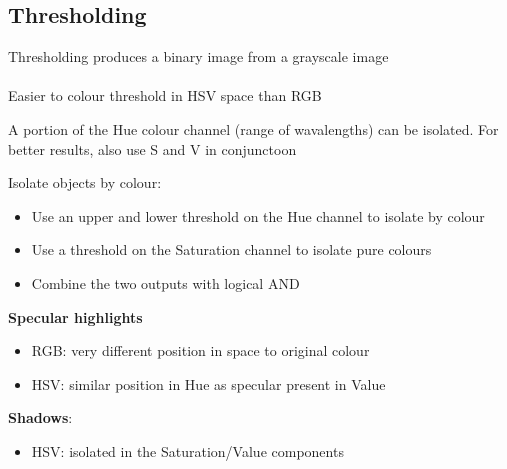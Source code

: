 \documentclass{article}[18pt]
\begin{document}
\subsection{Thresholding}
Thresholding produces a binary image from a grayscale image\\
\\
Easier to colour threshold in HSV space than RGB
\begin{definition}
	A portion of the Hue colour channel (range of wavalengths) can be isolated. For better results, also use S and V in conjunctoon
\end{definition}
Isolate objects by colour:
\begin{itemize}
	\item Use an upper and lower threshold on the Hue channel to isolate by colour
	\item Use a threshold on the Saturation channel to isolate pure colours
	\item Combine the two outputs with logical AND
\end{itemize}
\textbf{Specular highlights}
\begin{itemize}
	\item RGB: very different position in space to original colour
	\item HSV: similar position in Hue as specular present in Value
\end{itemize}
\textbf{Shadows}:
\begin{itemize}
	\item HSV: isolated in the Saturation/Value components
\end{itemize}
\end{document}
